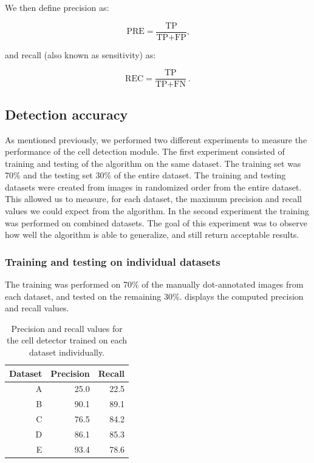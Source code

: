 	We then define precision as:
	
	\[
		\text{PRE} = \frac{\text{TP}}{\text{TP}+\text{FP}}\text{,}
	\]
	
	\noindent and recall (also known as sensitivity) as:
	
	\[
		\text{REC} = \frac{\text{TP}}{\text{TP} + \text{FN}}\ \text{.}
	\]
	
	\subsection{Detection accuracy \statusfirstdraft}
			
		As mentioned previously, we performed two different experiments to measure the performance of the cell detection module. The first experiment consisted of training and testing of the algorithm on the same dataset. The training set was 70\% and the testing set 30\% of the entire dataset. The training and testing datasets were created from images in randomized order from the entire dataset. This allowed us to measure, for each dataset, the maximum precision and recall values we could expect from the algorithm. In the second experiment the training was performed on combined datasets. The goal of this experiment was to observe how well the algorithm is able to generalize, and still return acceptable results.
		
		\subsubsection{Training and testing on individual datasets}
		
		The training was performed on 70\% of the manually dot-annotated images from each dataset, and tested on the remaining 30\%.  displays the computed precision and recall values.
		
		
		\begin{table}[h]
			\centering
			\begin{tabular}{rrr}
				Dataset & Precision & Recall \\
				\hline
				      A &      25.0 &   22.5 \\
				      B &      90.1 &   89.1 \\
				      C &      76.5 &   84.2 \\
				      D &      86.1 &   85.3 \\
				      E &      93.4 &   78.6
			\end{tabular} 
			\caption{Precision and recall values for the cell detector trained on each dataset individually.}
			\label{tab:results_detector_individual}
		\end{table}
		
